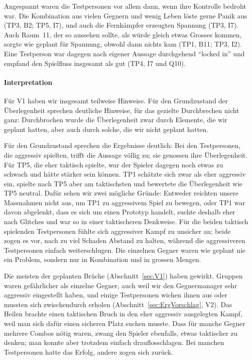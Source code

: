 \documentclass[../Main.tex]{subfiles}
\begin{document}
Angespannt waren die Testpersonen vor allem dann, wenn ihre Kontrolle bedroht war. Die Kombination aus vielen Gegnern und wenig Leben löste gerne Panik aus (TP3, B2; TP5, I7), und auch die Fernkämpfer erzeugten Spannung (TP3, I7). Auch Raum~11, der so aussehen sollte, als würde gleich etwas Grosses kommen, sorgte wie geplant für Spannung, obwohl dann nichts kam (TP1, B11; TP3, I2). Eine Testperson war dagegen nach eigener Aussage durchgehend \enquote{locked in} und empfand den Spielfluss insgesamt als gut (TP4, I7 und Q10).

\paragraph{Interpretation}
Für V1 haben wir insgesamt teilweise Hinweise. Für den Grundzustand der Überlegenheit sprechen deutliche Hinweise, für das gezielte Durchbrechen nicht ganz: Durchbrochen wurde die Überlegenheit zwar durch Elemente, die wir geplant hatten, aber auch durch solche, die wir nicht geplant hatten.

Für den Grundzustand sprechen die Ergebnisse deutlich: Bei den Testpersonen, die aggressiv spielten, trifft die Aussage völlig zu; sie genossen ihre Überlegenheit. Für TP5, die eher taktisch spielte, war der Spieler dagegen noch etwas zu schwach und hätte stärker sein können. TP1 schätzte sich zwar als eher aggressiv ein, spielte nach TP5 aber am taktischsten und bewertete die Überlegenheit wie TP5 neutral. Dafür sehen wir zwei mögliche Gründe: Entweder reichten unsere Massnahmen nicht aus, um TP1 zu aggressivem Spiel zu bewegen, oder TP1 war davon abgelenkt, dass es sich um einen Prototyp handelt, suchte deshalb eher nach Glitches und war so in einer taktischeren Denkweise. Für die beiden taktisch spielenden Testpersonen fühlte sich aggressiver Kampf zu unsicher an; beide zogen es vor, nach zu viel Schaden Abstand zu halten, während die aggressiveren Testpersonen einfach weiterschlugen. Die einzelnen Gegner waren wie geplant nie ein Problem, sondern nur in Kombination und in grossen Mengen.

Die meisten der geplanten Brüche (Abschnitt~\ref{sec:V1}) haben gewirkt. Gruppen waren gefährlicher als einzelne Gegner, auch weil wir den Gegnermanager sehr aggressiv eingestellt haben, und einige Testpersonen wichen ihnen aus oder mussten sich zwischendurch erholen (Abschnitt~\ref{sec:ErgVorschlag}, V2). Das Heilen brachte einen taktischen Bruch in den eher aggressiv ausgelegten Kampf, weil man sich dafür einen sicheren Platz suchen musste. Dass für manche Gegner mehrere Combos nötig waren, zwang den Spieler ebenfalls, etwas taktischer zu denken; man konnte aber trotzdem einfach drauflosschlagen. Bei manchen Testpersonen hatte das Erfolg, andere zogen sich zurück.
\end{document}
